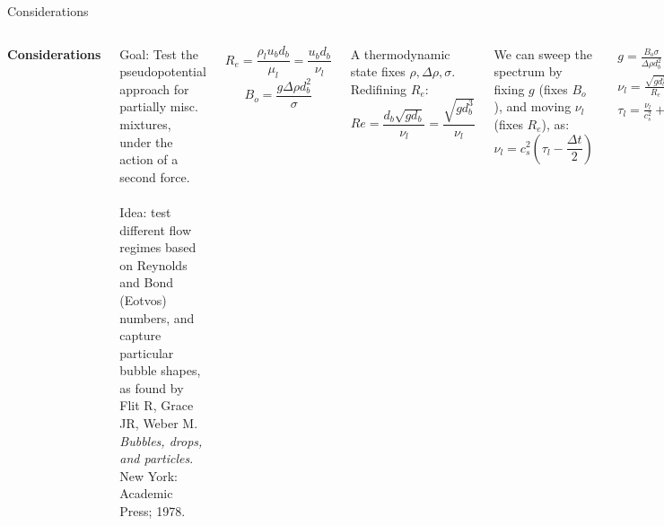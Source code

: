 \documentclass[8pt]{beamer}
\begin{document}
	\begin{frame}[t]{Considerations}
		\justifying
		
		
		\begin{columns}[t]
			
			\textbf{Considerations}\\~\\
			\justifying
			
			Goal: Test the pseudopotential approach for partially misc. mixtures, under the action of a second force.\\~\\
			
			Idea: test different flow regimes based on Reynolds and Bond (Eotvos) numbers, and capture particular bubble shapes, as found by Flit R, Grace JR, Weber M. \textit{Bubbles, drops, and particles}. New York: Academic Press; 1978. 
			
			\begin{equation*}
			R_e = \frac{\rho_l u_b d_b}{\mu_l} = \frac{u_b d_b}{\nu_l}
			\end{equation*}
			\begin{equation*}
			B_o = \frac{g \Delta \rho d_b^2}{\sigma}
			\end{equation*}
			
			
			A thermodynamic state fixes $\rho, \Delta \rho, \sigma$. Redifining $R_e$:
			\begin{equation*}
				Re = \frac{d_b \sqrt{g d_b} }{\nu_l} =  \frac{\sqrt{g d_b^3}}{\nu_l}
			\end{equation*}
			
			We can sweep the spectrum by fixing $g$ (fixes $B_o$), and moving $\nu_l$ (fixes $R_e$), as:
			\begin{equation*}
				\nu_l = c_s^2 (\tau_l - \frac{\Delta t}{2})
			\end{equation*}
				
			\begin{equation*}
				\begin{split}
					g = \frac{B_o \sigma}{\Delta \rho d_b^2}\\
					\nu_l = \frac{\sqrt{g d_b^3}}{R_e}\\
					\tau_l = \frac{\nu_l}{c_s^2}+ \frac{\Delta t}{2}
				\end{split}
			\end{equation*}
		\end{columns}
	\end{frame}
	
\end{document}
